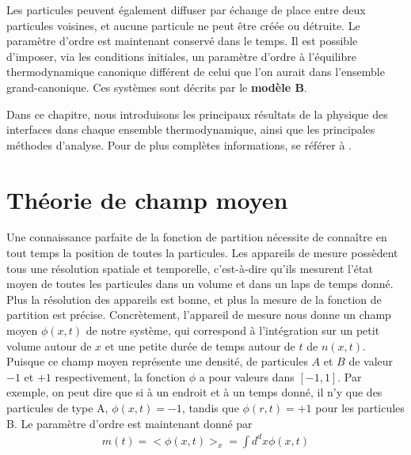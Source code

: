 Les particules peuvent également diffuser par échange de place entre deux particules voisines, et aucune particule ne peut être créée ou détruite. Le paramètre d'ordre est maintenant conservé dans le temps. Il est possible d'imposer, via les conditions initiales, un paramètre d'ordre à l'équilibre thermodynamique canonique différent de celui que l'on aurait dans l'ensemble grand-canonique. Ces systèmes sont décrits par le \textbf{modèle B}.

Dans ce chapitre, nous introduisons les principaux résultats de la physique des interfaces dans chaque ensemble thermodynamique, ainsi que les principales méthodes d'analyse. Pour de plus complètes informations, se référer à \cite{hohenberg_theory_1977,bray_theory_1994,krapivsky_kinetic_2010,halpin-healy_kinetic_1995}.

    \section{Théorie de champ moyen}

Une connaissance parfaite de la fonction de partition nécessite de connaître en tout temps la position de toutes la particules. Les appareils de mesure possèdent tous une résolution spatiale et temporelle, c'est-à-dire qu'ils mesurent l'état moyen de toutes les particules dans un volume et dans un laps de temps donné. Plus la résolution des appareils est bonne, et plus la mesure de la fonction de partition est précise. 
Concrètement, l'appareil de mesure nous donne un champ moyen $\phi(x,t)$ de notre système, qui correspond à l'intégration sur un petit volume autour de $x$ et une petite durée de temps autour de $t$ de $n(x,t)$. 
Puisque ce champ moyen représente une densité, de particules $A$ et $B$ de valeur $-1$ et $+1$ respectivement, la fonction $\phi$ a pour valeurs dans $[-1,1]$.
Par exemple, on peut dire que si à un endroit et à un temps donné, il n'y que des particules de type A, $\phi(x,t)=-1$, tandis que $\phi(r,t)=+1$ pour les particules B. Le paramètre d'ordre est maintenant donné par
\begin{align}
    m(t) = <\phi(x,t)>_x = \int d^dx  \phi(x,t)
\end{align}

